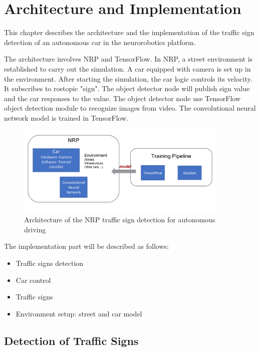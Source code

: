 
\section{Architecture and Implementation}

This chapter describes the architecture and the implementation of the traffic sign detection of an autonomous car in the neurorobotics platform. 

The architecture involves NRP and TensorFlow. In NRP, a street environment is established to carry out the simulation. A car equipped with camera is set up in the environment. After starting the simulation, the car logic controls its velocity. It subscribes to rostopic "sign". The object detector node will publish sign value and the car responses to the value. The object detector node use TensorFlow object detection module to recognize images from video. The convolutional neural network model is trained in TensorFlow.

\begin{figure}
  \centering
  \includegraphics[width=0.9\textwidth]{chapter/images/img-1.png}
  \caption{Architecture of the NRP traffic sign detection for autonomous driving}
  \label{fig:img}
\end{figure}


The implementation part will be described as follows: 
\begin{itemize}
	\item Traffic signs detection
	\item Car control
	\item Traffic signs
	\item Environment setup: street and car model
	 
\end{itemize}

\subsection{Detection of Traffic Signs}

